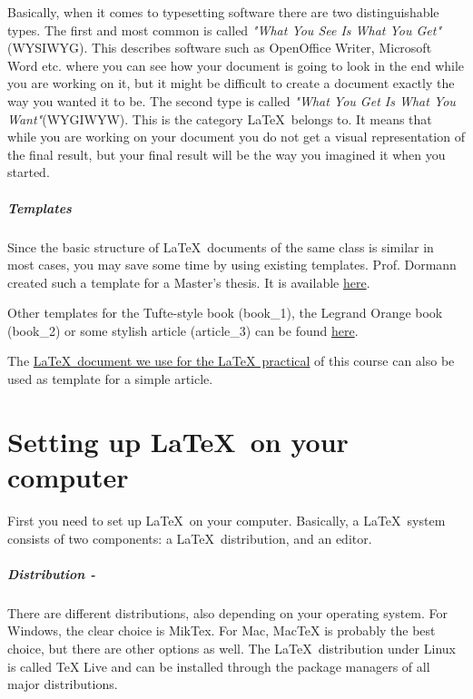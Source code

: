 \documentclass[]{tufte-book} %
\begin{document}
 Basically, when it comes to typesetting software there are two distinguishable types. The first and most common is called \emph{"What You See Is What You Get"} (WYSIWYG). This describes software such as OpenOffice Writer, Microsoft Word etc. where you can see how your document is going to look in the end while you are working on it, but it might be difficult to create a document exactly the way you wanted it to be. The second type is called \emph{"What You Get Is What You Want"}(WYGIWYW). This is the category \LaTeX\ belongs to. It means that while you are working on your document you do not get a visual representation of the final result, but your final result will be the way you imagined it when you started.  	

\paragraph{Templates}
Since the basic structure of \LaTeX\ documents of the same class is similar in most cases, you may save some time by using existing templates. Prof. Dormann created such a template for a Master's thesis. It is available \href{https://github.com/florianhartig/ResearchSkills/tree/master/Labs/LaTeX/LaTeX_Templates/Template-BScMSc-Freiburg}{here}.
 
Other templates for the Tufte-style book (book\_1), the Legrand Orange book (book\_2) or some stylish article (article\_3) can be found \href{https://github.com/florianhartig/ResearchSkills/tree/master/Labs/LaTeX/LaTeX_Templates/LatexTemplates}{here}.
 
The \href{https://github.com/florianhartig/ResearchSkills/tree/master/Labs/LaTeX/Practical}{\LaTeX\ document we use for the \LaTeX\ practical} of this course can also be used as template for a simple article. 

\chapter{Setting up \LaTeX\ on your computer}

First you need to set up \LaTeX\ on your computer. Basically, a \LaTeX\ system consists of two components: a \LaTeX\ distribution, and an editor.

\paragraph{Distribution -}There are different distributions, also depending on your operating system. For Windows, the clear choice is MikTex. For Mac, MacTeX is probably the best choice, but there are other options as well. The \LaTeX\ distribution under Linux is called TeX Live and can be installed through the package managers of all major distributions.
\end{document}
